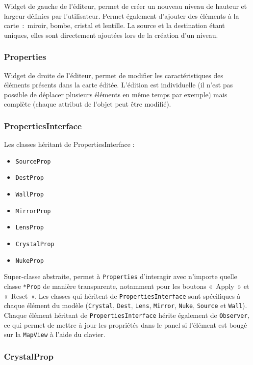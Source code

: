 \documentclass[]{report}
\begin{document}
Widget de gauche de l'éditeur, permet de créer un nouveau niveau de hauteur et
largeur définies par l'utilisateur.
Permet également d’ajouter des éléments à la carte~:~miroir, bombe, cristal et lentille. La source et la destination étant uniques, 
elles sont directement ajoutées lors de la création d’un niveau.

\subsubsection{\label{Properties}Properties}

Widget de droite de l’éditeur, permet de modifier les caractéristiques des éléments présents dans la carte éditée.
L'édition est individuelle (il n’est pas possible de déplacer plusieurs éléments
en même temps par exemple) mais complète (chaque attribut de l'objet peut être modifié).

\subsubsection{\label{PropertiesInterface}PropertiesInterface}

Les classes héritant de PropertiesInterface :

\begin{itemize}
    \item \texttt{SourceProp}
    \item \texttt{DestProp}
    \item \texttt{WallProp}
    \item \texttt{MirrorProp}
    \item \texttt{LensProp}
    \item \texttt{CrystalProp}
    \item \texttt{NukeProp}
\end{itemize}

Super-classe abstraite, permet à \texttt{Properties} d’interagir avec n’importe quelle classe \texttt{*Prop} de manière transparente, 
notamment pour les boutons «~Apply~» et «~Reset~».
Les classes qui héritent de \texttt{PropertiesInterface} sont spécifiques à chaque élément du modèle 
(\texttt{Crystal}, \texttt{Dest}, \texttt{Lens}, \texttt{Mirror}, \texttt{Nuke}, \texttt{Source} et \texttt{Wall}).
Chaque élément héritant de \texttt{PropertiesInterface} hérite également de
\texttt{Observer}, ce qui permet de mettre à jour les propriétés dans le panel
si l'élément est bougé sur la \texttt{MapView} à l'aide du clavier.

\subsubsection{\label{CrystalProp}CrystalProp}
\end{document}
